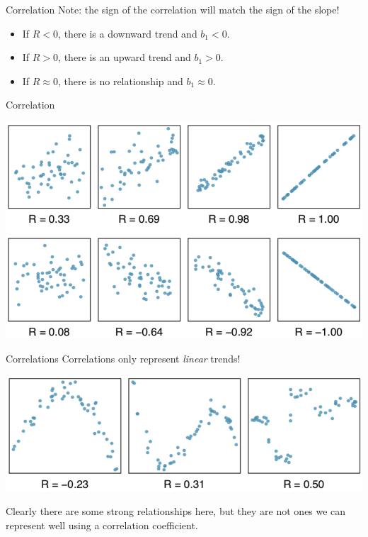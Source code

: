 \begin{frame}{Correlation}
    Note: the sign of the correlation will match the sign of the slope!
    \begin{itemize}
        \item If $R < 0$, there is a downward trend and $b_1 < 0$.
        \item If $R > 0$, there is an upward trend and $b_1 > 0$.
        \item If $R \approx 0$, there is no relationship and $b_1 \approx 0$.
    \end{itemize}
\end{frame}

\begin{frame}{Correlation}
    \begin{center}
        \includegraphics[scale=0.35]{images/correlations.png}
    \end{center}
\end{frame}

\begin{frame}{Correlations}
    Correlations only represent \textit{linear} trends!
    \begin{center}
        \includegraphics[scale=0.4]{images/nonlincor.png}
    \end{center}
    Clearly there are some strong relationships here, but they are not ones we can represent well using a correlation coefficient.
\end{frame}